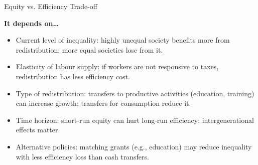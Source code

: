 \documentclass[11pt, a4paper, twoside]{book}
\begin{document}
\begin{evaluation}{Equity vs. Efficiency Trade-off}
\begin{itemize}[leftmargin=*, nosep]
\end{itemize}
\textbf{It depends on\ldots}
\begin{itemize}[leftmargin=*, nosep]
\item Current level of inequality: highly unequal society benefits more from redistribution; more equal societies lose from it.
\item Elasticity of labour supply: if workers are not responsive to taxes, redistribution has less efficiency cost.
\item Type of redistribution: transfers to productive activities (education, training) can increase growth; transfers for consumption reduce it.
\item Time horizon: short-run equity can hurt long-run efficiency; intergenerational effects matter.
\item Alternative policies: matching grants (e.g., education) may reduce inequality with less efficiency loss than cash transfers.
\end{itemize}
\end{evaluation}
\end{document}
